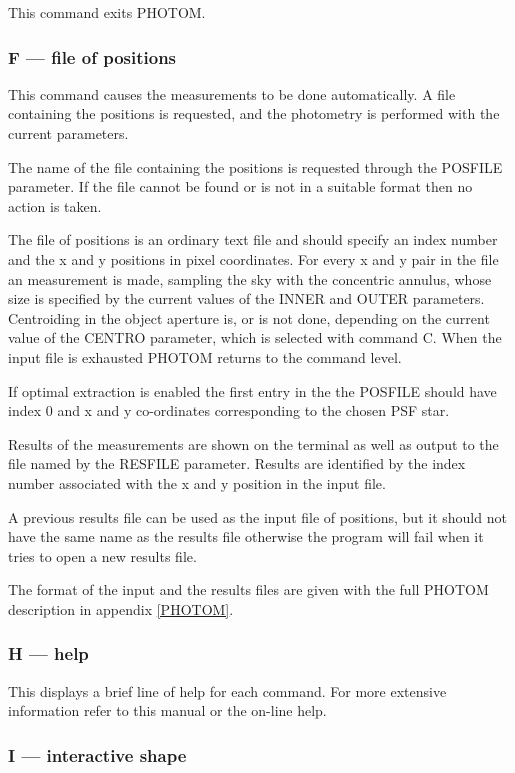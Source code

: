 \documentclass[twoside,11pt]{article}
\newcommand{\htmlref}[2]{#1}
\newcommand{\latex}[1]{#1}
\renewcommand{\_}{\texttt{\symbol{95}}}
\begin{document}
This command exits PHOTOM.

\subsubsection{F --- file of positions}

This command causes the measurements to be done automatically. A file
containing the positions is requested, and the photometry is performed
with the current parameters.

The name of the file containing the positions is requested through the
POSFILE parameter. If the file cannot be found or is not in a suitable
format then no action is taken.

The file of positions is an ordinary text file and should specify an
index number and the x and y positions in pixel coordinates. For every
x and y pair in the file an measurement is made, sampling the
sky with the concentric annulus, whose size is specified by the
current values of the INNER and OUTER parameters. Centroiding in the
object aperture is, or is not done, depending on the current value of
the CENTRO parameter, which is selected with command C. When the input
file is exhausted PHOTOM returns to the command level.

If optimal extraction is enabled the first entry in the the POSFILE
should have index 0 and x and y co-ordinates corresponding to
the chosen PSF star.

Results of the measurements are shown on the terminal as well as output
to the file named by the RESFILE parameter. Results are identified by
the index number associated with the x and y position in the input file.

A previous results file can be used as the input file of positions, but
it should not have the same name as the results file otherwise the
program will fail when it tries to open a new results file.

The format of the input and the results files are given with the full
\htmlref{PHOTOM description}{PHOTOM} \latex{in appendix \ref{PHOTOM}}.

\subsubsection{H --- help}

This displays a brief line of help for each command. For more extensive
information refer to this manual or the on-line help.

\subsubsection{I --- interactive shape}
\end{document}
